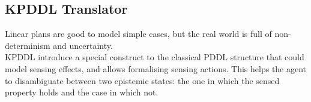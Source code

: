 \documentclass[pdftex,12pt,a4paper]{report}
\begin{document}
\newpage
\subsection{KPDDL Translator}
Linear plans are good to model simple cases, but the real world is full of non-determinism and uncertainty. \\
KPDDL introduce a special construct to the classical PDDL structure that could model sensing effects, and allows formalising sensing actions. This helps the agent to disambiguate between two epistemic states: the one in which the sensed property holds and the case in which not.\\
\newline
{}

\newpage
\end{document}
